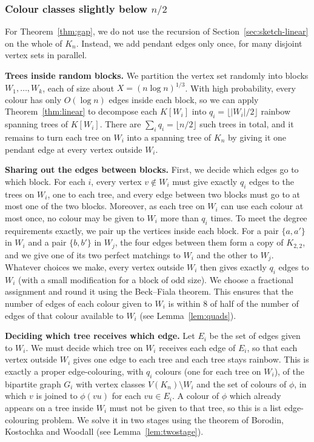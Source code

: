 \subsubsection{Colour classes slightly below $n/2$}\label{sec:sketch-gap}
For Theorem~\ref{thm:gap}, we do not use the recursion of Section~\ref{sec:sketch-linear} on the whole of $K_n$. Instead, we add pendant edges only once, for many disjoint vertex sets in parallel.

\smallskip

\noindent\textbf{Trees inside random blocks.}
We partition the vertex set randomly into blocks $W_1,\ldots,W_k$, each of size about $X=(n\log n)^{1/3}$.
With high probability, every colour has only $O(\log n)$ edges inside each block, so we can apply Theorem~\ref{thm:linear} to decompose each $K[W_i]$ into $q_i=\lfloor |W_i|/2\rfloor$ rainbow spanning trees of $K[W_i]$.
There are $\sum_i q_i=\lfloor n/2\rfloor$ such trees in total, and it remains to turn each tree on $W_i$ into a spanning tree of $K_n$ by giving it one pendant edge at every vertex outside $W_i$.

\smallskip

\noindent\textbf{Sharing out the edges between blocks.}
First, we decide which edges go to which block.
For each $i$, every vertex $v\notin W_i$ must give exactly $q_i$ edges to the trees on $W_i$, one to each tree, and every edge between two blocks must go to at most one of the two blocks.
Moreover, as each tree on $W_i$ can use each colour at most once, no colour may be given to $W_i$ more than $q_i$ times.
To meet the degree requirements exactly, we pair up the vertices inside each block. For a pair $\{a,a'\}$ in $W_i$ and a pair $\{b,b'\}$ in $W_j$, the four edges between them form a copy of $K_{2,2}$, and we give one of its two perfect matchings to $W_i$ and the other to $W_j$.
Whatever choices we make, every vertex outside $W_i$ then gives exactly $q_i$ edges to $W_i$ (with a small modification for a block of odd size).
We choose a fractional assignment and round it using the Beck--Fiala theorem. This ensures that the number of edges of each colour given to $W_i$ is within $8$ of half of the number of edges of that colour available to $W_i$ (see Lemma~\ref{lem:quads}).

\smallskip

\noindent\textbf{Deciding which tree receives which edge.}
Let $E_i$ be the set of edges given to $W_i$.
We must decide which tree on $W_i$ receives each edge of $E_i$, so that each vertex outside $W_i$ gives one edge to each tree and each tree stays rainbow.
This is exactly a proper edge-colouring, with $q_i$ colours (one for each tree on $W_i$), of the bipartite graph $G_i$ with vertex classes $V(K_n)\setminus W_i$ and the set of colours of $\phi$, in which $v$ is joined to $\phi(vu)$ for each $vu\in E_i$.
A colour of $\phi$ which already appears on a tree inside $W_i$ must not be given to that tree, so this is a list edge-colouring problem.
We solve it in two stages using the theorem of Borodin, Kostochka and Woodall (see Lemma~\ref{lem:twostage}).

